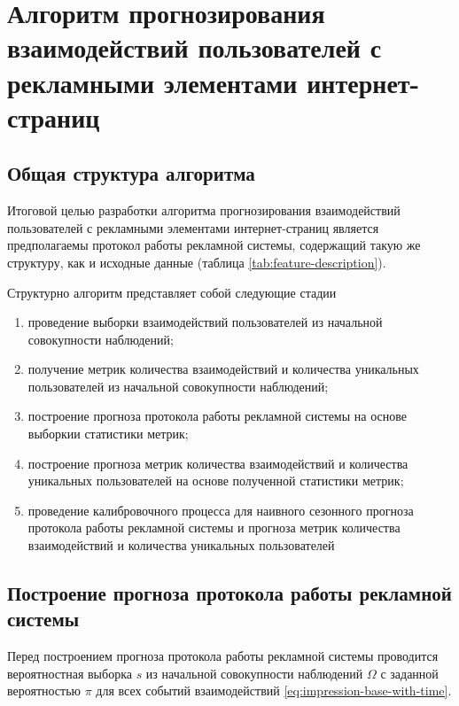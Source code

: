 \section{Алгоритм прогнозирования взаимодействий пользователей с рекламными элементами интернет-страниц}
\subsection{Общая структура алгоритма}
Итоговой целью разработки алгоритма прогнозирования взаимодействий пользователей с рекламными элементами интернет-страниц
является предполагаемы протокол работы рекламной системы, содержащий такую же структуру, как и исходные данные 
(таблица \ref{tab:feature-description}).

Структурно алгоритм представляет собой следующие стадии
\begin{enumerate}
    \item проведение выборки взаимодействий пользователей из начальной совокупности наблюдений;
    \item получение метрик количества взаимодействий и количества уникальных пользователей из начальной совокупности 
    наблюдений;
    \item построение прогноза протокола работы рекламной системы на основе выборкии статистики метрик;
    \item построение прогноза метрик количества взаимодействий и количества уникальных пользователей на основе 
    полученной статистики метрик;
    \item проведение калибровочного процесса для наивного сезонного прогноза протокола работы рекламной системы
    и прогноза метрик количества взаимодействий и количества уникальных пользователей
\end{enumerate}

\subsection{Построение прогноза протокола работы рекламной системы}
Перед построением прогноза протокола работы рекламной системы проводится вероятностная выборка $s$ из начальной совокупности 
наблюдений $\Omega$ с заданной вероятностью $\pi$ для всех событий взаимодействий \eqref{eq:impression-base-with-time}.

